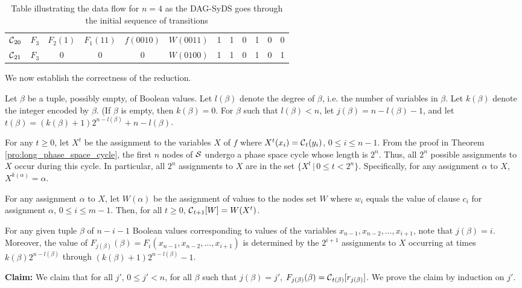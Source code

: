\begin{table*}
\begin{center}
\begin{tabular}{|l | c c c c c c c c c c c |}
$\mbox{$\mathcal{C}$}_{20}$ & $F_3$ & $F_2(1)$ & $F_1(11)$ & $f(0010)$ & $W(0011)$ & 1 & 1 & 0 & 1 & 0 & 0 \\ 
$\mbox{$\mathcal{C}$}_{21}$ & $F_3$ & 0 & 0 & 0 & $W(0100)$ & 1 & 1 & 0 & 1 & 0 & 1 \\ \hline
\end{tabular}
\end{center}
\caption{Table illustrating the data flow for $n = 4$ 
as the DAG-SyDS \cals{} goes through the initial sequence of transitions}
\label{tab:dag_syds_trans}
\end{table*}

\bigskip
We now establish the correctness of the reduction.

Let $\beta$ be a tuple, possibly empty, of Boolean values. 
Let  $l(\beta)$ denote the degree of $\beta$,
i.e. the number of variables in $\beta$.
Let  $k(\beta)$ denote the integer encoded by $\beta$.
(If  $\beta$ is empty, then $k(\beta) = 0$.
For $\beta$ such that $l(\beta) < n$, 
let $j(\beta) = n - l(\beta) -1$,
and let $t(\beta) = (k(\beta)+1) 2^{n-l(\beta)} +n -l(\beta)$. 

For any $ t \geq 0$,
let  $X^t$ be the assignment to the variables $X$ of $f$ where 
$X^t(x_i) = \mbox{$\mathcal{C}$} _t(y_i)$, $ 0 \leq i \leq n-1$.
From the proof in Theorem \ref{pro:long_phase_space_cycle}, 
the first $n$ nodes of $\mbox{$\mathcal{S}$}$ undergo a phase space cycle whose length is $2^n$.
Thus, all $2^n$ possible assignments to $X$ occur during this cycle.
In particular, all $2^n$ assignments to $X$ are in the set $\{  X^t \, | \, 0 \leq t < 2^n \}$.
Specifically, for any assignment $\alpha$ to $X$, $X^{k(\alpha)} = \alpha$.


For any assignment $\alpha$ to $X$, 
let $W(\alpha)$ be the assignment of values to the nodes set $W$ 
where $w_i$ equals the value of clause $c_i$ for assignment $\alpha$, $ 0 \leq i \leq m-1$.
Then,  for all $t \geq 0$, $\mbox{$\mathcal{C}$}_{t+1}[W] = W(X^t)$.

For any given tuple $\beta$ of  $n-i-1$ Boolean values 
corresponding to values of the variables $x_{n-1}, x_{n-2}, \ldots , x_{i+1}$,
note that $j(\beta) = i$.
Moreover, the value of $F_{j(\beta)}(\beta) = F_i(x_{n-1}, x_{n-2}, \ldots , x_{i+1})$
is determined by the $2^{i+1}$ assignments to $X$  occurring at times 
$k(\beta) 2^{n-l(\beta)}$ through $(k(\beta)+1) 2^{n-l(\beta)}-1$.

\smallskip
\noindent
{\bf Claim:} We claim that for all $j'$, $0 \leq j' < n$,
for all $\beta$ such that $j(\beta) = j'$,
$F_{j(\beta)}(\beta) =\mbox{$\mathcal{C}$}_{t(\beta)}[r_{j(\beta)}]$.
We prove the claim by induction on $j'$.

